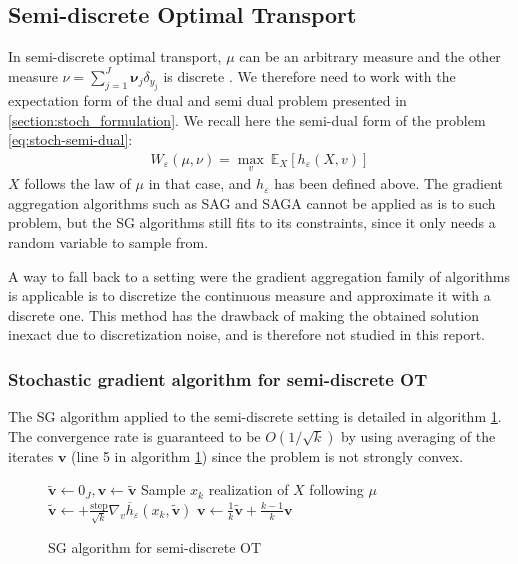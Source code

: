 \subsection{Semi-discrete Optimal Transport}
In semi-discrete optimal transport, $\mu$ can be an arbitrary measure and the other measure $\nu = \sum_{j=1}^J \mathbf{\nu}_j \delta_{y_j}$ is discrete \cite{peyre_computational_2018}. We therefore need to work with the expectation form of the dual and semi dual problem presented in \ref{section:stoch_formulation}. We recall here the semi-dual form of the problem \eqref{eq:stoch-semi-dual}: 
\begin{align*}
    W_\varepsilon(\mu, \nu) = \max_{v}\  \mathbb{E}_{X}[h_\varepsilon(X, v)]
\end{align*}
$X$ follows the law of $\mu$ in that case, and $h_\varepsilon$ has been defined above. The gradient aggregation algorithms such as SAG and SAGA cannot be applied as is to such problem, but the SG algorithms still fits to its constraints, since it only needs a random variable to sample from. 

A way to fall back to a setting were the gradient aggregation family of algorithms is applicable is to discretize the continuous measure and approximate it with a discrete one. This method has the drawback of making the obtained solution inexact due to discretization noise, and is therefore not studied in this report.

\subsubsection{Stochastic gradient algorithm for semi-discrete OT}

The SG algorithm applied to the semi-discrete setting is detailed in algorithm \ref{alg:sg_semi_discrete}. The convergence rate is guaranteed to be $O(1/\sqrt{k})$ by using averaging of the iterates $\bm{v}$ \cite{polyak_acceleration_1992} (line 5 in algorithm \ref{alg:sg_semi_discrete}) since the problem is not strongly convex.

\begin{figure}[h]
    \centering
    \begin{minipage}{.8\linewidth}
    \begin{algorithm}[H]
        \caption{SG algorithm for semi-discrete OT}\label{alg:sg_semi_discrete}
        \begin{algorithmic}[1]
            \State $\tilde{\bm{v}} \gets 0_J, \bm{v} \gets \tilde{\bm{v}}$
                \State Sample $x_k$ realization of $X$ following $\mu$
                \State $\tilde{\bm{v}} \gets + \frac{\text{step}}{\sqrt{k}} \nabla_v \overline{h}_\varepsilon(x_k, \tilde{\bm{v}})$
                \State $\bm{v} \gets \frac{1}{k}\tilde{\bm{v}} + \frac{k-1}{k}\bm{v}$
            \EndFor
        \end{algorithmic}
    \end{algorithm}
\end{minipage}
\end{figure}

